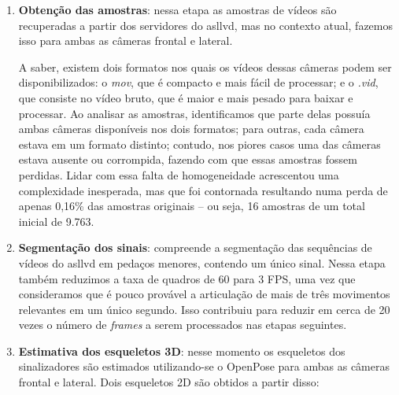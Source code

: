 
\begin{enumerate}
    \item \textbf{Obtenção das amostras}: nessa etapa as amostras de vídeos são recuperadas a partir dos servidores do \acrshort{asllvd}, mas no contexto atual, fazemos isso para ambas as câmeras frontal e lateral.

          A saber, existem dois formatos nos quais os vídeos dessas câmeras podem ser disponibilizados: o \textit{mov}, que é compacto e mais fácil de processar; e o \textit{.vid}, que consiste no vídeo bruto, que é maior e mais pesado para baixar e processar.
          Ao analisar as amostras, identificamos que parte delas possuía ambas câmeras disponíveis nos dois formatos; para outras, cada câmera estava em um formato distinto; contudo, nos piores casos uma das câmeras estava ausente ou corrompida, fazendo com que essas amostras fossem perdidas. Lidar com essa falta de homogeneidade acrescentou uma complexidade inesperada, mas que foi contornada resultando numa perda de apenas 0,16\% das amostras originais -- ou seja, 16 amostras de um total inicial de 9.763.


    \item \textbf{Segmentação dos sinais}: compreende a segmentação das sequências de vídeos do \acrshort{asllvd} em pedaços menores, contendo um único sinal.
          Nessa etapa também reduzimos a taxa de quadros de 60 para 3 FPS, uma vez que consideramos que é pouco provável a articulação de mais de três movimentos relevantes em um único segundo.
          Isso contribuiu para reduzir em cerca de 20 vezes o número de \textit{frames} a serem processados nas etapas seguintes.


    \item \textbf{Estimativa dos esqueletos 3D}: nesse momento os esqueletos dos sinalizadores são estimados utilizando-se o OpenPose para ambas as câmeras frontal e lateral. Dois esqueletos 2D são obtidos a partir disso:


\end{enumerate}
